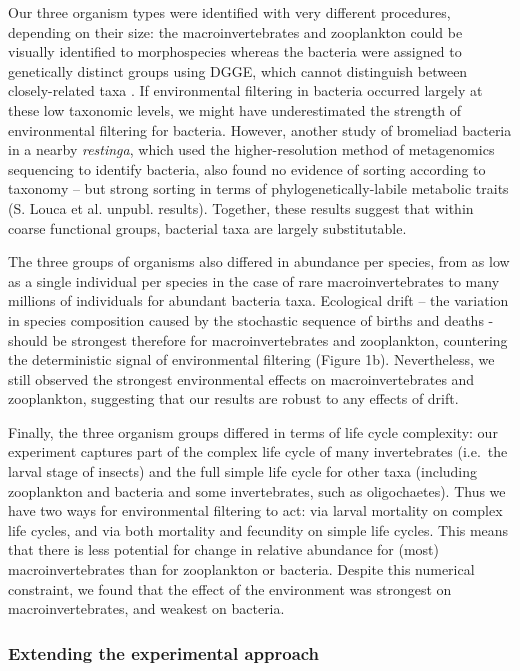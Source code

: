 Our three organism types were identified with very different procedures,
depending on their size: the macroinvertebrates and zooplankton could be
visually identified to morphospecies whereas the bacteria were assigned
to genetically distinct groups using DGGE, which cannot distinguish
between closely-related taxa \citep{Wiedenbeck2011}. If environmental
filtering in bacteria occurred largely at these low taxonomic levels, we
might have underestimated the strength of environmental filtering for
bacteria. However, another study of bromeliad bacteria in a nearby
\emph{restinga}, which used the higher-resolution method of metagenomics
sequencing to identify bacteria, also found no evidence of sorting
according to taxonomy -- but strong sorting in terms of
phylogenetically-labile metabolic traits (S. Louca et al. unpubl.
results). Together, these results suggest that within coarse functional
groups, bacterial taxa are largely substitutable.

The three groups of organisms also differed in abundance per species,
from as low as a single individual per species in the case of rare
macroinvertebrates to many millions of individuals for abundant bacteria
taxa. Ecological drift -- the variation in species composition caused by
the stochastic sequence of births and deaths - should be strongest
therefore for macroinvertebrates and zooplankton, countering the
deterministic signal of environmental filtering (Figure 1b).
Nevertheless, we still observed the strongest environmental effects on
macroinvertebrates and zooplankton, suggesting that our results are
robust to any effects of drift.

Finally, the three organism groups differed in terms of life cycle
complexity: our experiment captures part of the complex life cycle of
many invertebrates (i.e.~the larval stage of insects) and the full
simple life cycle for other taxa (including zooplankton and bacteria and
some invertebrates, such as oligochaetes). Thus we have two ways for
environmental filtering to act: via larval mortality on complex life
cycles, and via both mortality and fecundity on simple life cycles. This
means that there is less potential for change in relative abundance for
(most) macroinvertebrates than for zooplankton or bacteria. Despite this
numerical constraint, we found that the effect of the environment was
strongest on macroinvertebrates, and weakest on bacteria.

\subsubsection{Extending the experimental
approach}\label{extending-the-experimental-approach}

